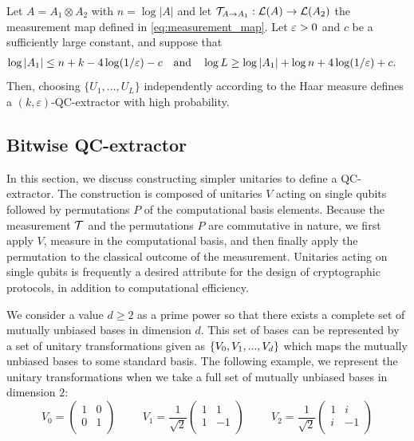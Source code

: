 \begin{theorem}
    Let $A = A_{1} \otimes A_{2}$ with $n = \log |A|$ and let $\mathcal{T}_{A \to A_{1}}: \mathcal{L}(A) \to \mathcal{L}(A_{2})$ the measurement map defined in \eqref{eq:measurement_map}. Let $\varepsilon > 0$ and $c$ be a sufficiently large constant, and suppose that 
    \begin{align*}
        \log |A_{1}| 
        &\le n + k - 4 \log (1 / \varepsilon) - c \quad \text{and} \quad 
        \log L 
        \geq \log |A_{1}| + \log n + 4 \log (1 / \varepsilon) + c. 
    \end{align*}
    Then, choosing $\{U_{1}, \dots, U_{L}\}$ independently according to the Haar measure \cite{davis1955note} defines a $(k,\varepsilon)$-QC-extractor with high probability.
\end{theorem}

\subsection{Bitwise QC-extractor}
In this section, we discuss constructing simpler unitaries to define a QC-extractor. The construction is composed of unitaries $V$ acting on single qubits followed by permutations $P$ of the computational basis elements. Because the measurement $\mathcal{T}$ and the permutations $P$ are commutative in nature, we first apply $V$, measure in the computational basis, and then finally apply the permutation  to the classical outcome of the measurement. Unitaries acting on single qubits is frequently a desired attribute for the design of cryptographic protocols, in addition to computational efficiency.

We consider a value $d \geq 2$ as a prime power so that there exists a complete set of mutually unbiased bases in dimension $d$. This set of bases can be represented by a set of unitary transformations given as $\{V_0, V_1,..., V_d\}$ which maps the mutually unbiased bases to some standard basis. The following example, we represent the unitary transformations when we take a full set of mutually unbiased bases in dimension $2$:
\begin{equation*}
    V_0 = 
    \begin{pmatrix}
    1 & 0 \\
    0 & 1 \\
    \end{pmatrix}
    \hspace{1cm}
    V_1 = \frac{1}{\sqrt{2}}
    \begin{pmatrix}
    1 & 1 \\
    1 & -1 \\
    \end{pmatrix}
    \hspace{1cm}
    V_2 = \frac{1}{\sqrt{2}} 
    \begin{pmatrix}
    1 & i \\
    i & -1 \\
    \end{pmatrix}
\end{equation*}

